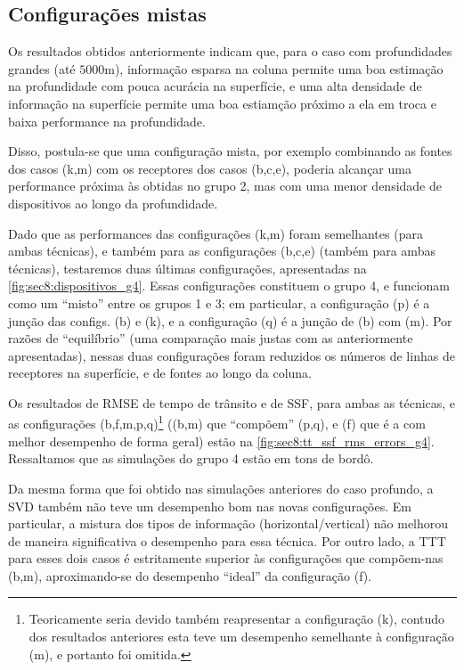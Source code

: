 \subsection{Configurações mistas}

Os resultados obtidos anteriormente indicam que, para o caso com profundidades grandes (até $5000\si{\meter}$), informação esparsa na coluna permite uma boa estimação na profundidade com pouca acurácia na superfície, e uma alta densidade de informação na superfície permite uma boa estiamção próximo a ela em troca e baixa performance na profundidade.

Disso, postula-se que uma configuração mista, por exemplo combinando as fontes dos casos (k,m) com os receptores dos casos (b,c,e), poderia alcançar uma performance próxima às obtidas no grupo 2, mas com uma menor densidade de dispositivos ao longo da profundidade.

Dado que as performances das configurações (k,m) foram semelhantes (para ambas técnicas), e também para as configurações (b,c,e) (também para ambas técnicas), testaremos duas últimas configurações, apresentadas na \cref{fig:sec8:dispositivos_g4}. Essas configurações constituem o grupo 4, e funcionam como um ``misto'' entre os grupos 1 e 3; em particular, a configuração (p) é a junção das configs. (b) e (k), e a configuração (q) é a junção de (b) com (m). Por razões de ``equilíbrio'' (uma comparação mais justas com as anteriormente apresentadas), nessas duas configurações foram reduzidos os números de linhas de receptores na superfície, e de fontes ao longo da coluna.

\def\sympathP{optimal-import--petro-deep/260527-14h15m17s-p--layer+vertical;blob}
\def\sympathQ{optimal-import--petro-deep/260527-14h15m17s-q--layer+sparse;blob}



Os resultados de RMSE de tempo de trânsito e de SSF, para ambas as técnicas, e as configurações (b,f,m,p,q)\footnote{Teoricamente seria devido também reapresentar a configuração (k), contudo dos resultados anteriores esta teve um desempenho semelhante à configuração (m), e portanto foi omitida.} ((b,m) que ``compõem'' (p,q), e (f) que é a com melhor desempenho de forma geral) estão na \cref{fig:sec8:tt_ssf_rms_errors_g4}. Ressaltamos que as simulações do grupo 4 estão em tons de bordô.

\const Da mesma forma que foi obtido nas simulações anteriores do caso profundo, a SVD também não teve um desempenho bom nas novas configurações. Em particular, a mistura dos tipos de informação (horizontal/vertical) não melhorou de maneira significativa o desempenho para essa técnica. Por outro lado, a TTT para esses dois casos é estritamente superior às configurações que compõem-nas (b,m), aproximando-se do desempenho ``ideal'' da configuração (f).

